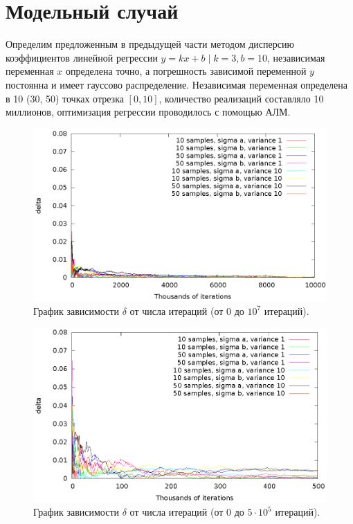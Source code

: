 \documentclass[11pt,a4paper]{article}
\theoremstyle{definition}
\begin{document}
\section{Модельный случай}

Определим предложенным в предыдущей части методом дисперсию коэффициентов
линейной регрессии $y = kx + b \mid k = 3, b = 10$, независимая
переменная $x$ определена точно, а погрешность зависимой переменной $y$
постоянна и имеет гауссово распределение. Независимая переменная
определена в 10 (30, 50) точках отрезка $[0, 10]$, количество реализаций
составляло 10 миллионов, оптимизация регрессии проводилось с помощью АЛМ.

\begin{figure}[h]
  \centering
  \includegraphics[scale=1.2]{figs/classic/variance_all_0_all.eps}
  \caption{График зависимости $\delta$ от числа итераций (от 0 до $10^7$ итераций).}
  \label{fig:classic_all_0_all}
\end{figure}

\begin{figure}[h]
  \centering
  \includegraphics[scale=1.2]{figs/classic/variance_all_0_500.eps}
  \caption{График зависимости $\delta$ от числа итераций (от 0 до $5 \cdot 10^5$ итераций).}
  \label{fig:classic_all_0_500}
\end{figure}
\end{document}
